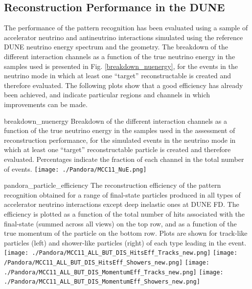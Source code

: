 \subsection{Reconstruction Performance in the DUNE }
\label{sec:Pandora:DUNEFD}

The performance of the  pattern recognition has been evaluated using a sample of accelerator neutrino and antineutrino interactions simulated using the reference DUNE neutrino energy spectrum and the \nominalmodsize {} geometry. The breakdown of the different interaction channels as a function of the true neutrino energy in the samples used is presented in Fig. \ref{breakdown_nuenergy}, for the events in the neutrino mode in which at least one ``target'' reconstructable  is created and therefore evaluated. The following plots show that a good efficiency has already been achieved, and indicate particular regions and channels in which improvements can be made. 

\begin{dunefigure}
{breakdown_nuenergy}
{Breakdown of the different interaction channels as a function of the true neutrino energy in the samples used in the assessment of reconstruction performance, for the simulated events in the neutrino mode in which at least one ``target'' reconstructable  particle is created and therefore evaluated. Percentages indicate the fraction of each channel in the total number of events.}
\texttt{[image: ./Pandora/MCC11\_NuE.png]}
\end{dunefigure}

\begin{dunefigure}
{pandora_particle_efficiency}
{The reconstruction efficiency of the  pattern recognition obtained for a range of final-state particles produced in all types of accelerator neutrino interactions except deep inelastic ones at DUNE FD. The efficiency is plotted as a function of the total number of \twod hits associated with the final-state  (summed across all views) on the top row, and as a function of the true momentum of the particle on the bottom row. Plots are shown for track-like particles (left) and shower-like particles (right) of each type leading in the event.}
\texttt{[image: ./Pandora/MCC11\_ALL\_BUT\_DIS\_HitsEff\_Tracks\_new.png]}
\texttt{[image: /Pandora/MCC11\_ALL\_BUT\_DIS\_HitsEff\_Showers\_new.png]}
\texttt{[image: ./Pandora/MCC11\_ALL\_BUT\_DIS\_MomentumEff\_Tracks\_new.png]}
\texttt{[image: ./Pandora/MCC11\_ALL\_BUT\_DIS\_MomentumEff\_Showers\_new.png]}
\end{dunefigure}


